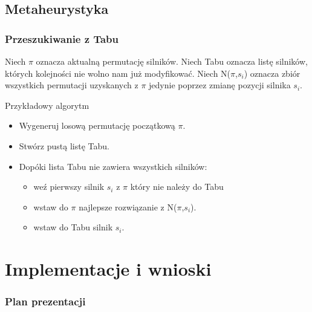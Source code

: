 \documentclass{beamer}
\begin{document}
	\subsection{Metaheurystyka}
		\begin{frame}
			\frametitle{Przeszukiwanie z Tabu}
			
            Niech $\pi$ oznacza aktualną permutację silników.
            \skip
            Niech Tabu oznacza listę silników, których kolejności nie wolno nam już modyfikować.
            \skip
            Niech N\left($\pi$,$s_i$\right) oznacza zbiór wszystkich permutacji uzyskanych z $\pi$ jedynie poprzez zmianę pozycji silnika $s_i$.

			\begin{block}{Przykładowy algorytm}
				\begin{itemize}
					\item Wygeneruj losową permutację początkową $\pi$.
					\item Stwórz pustą listę Tabu.
					\item Dopóki lista Tabu nie zawiera wszystkich silników:
                    \begin{itemize}
                        \item weź pierwszy silnik $s_i$ z $\pi$ który nie należy do Tabu
                        \item wstaw do $\pi$ najlepsze rozwiązanie z N\left($\pi$,$s_i$\right).
                        \item wstaw do Tabu silnik $s_i$.
                    \end{itemize}
				\end{itemize}
			\end{block}
            
		\end{frame}

\section{Implementacje i wnioski}

	\begin{frame}
		\frametitle{Plan prezentacji}
		\tableofcontents[currentsection]
	\end{frame}
\end{document}
